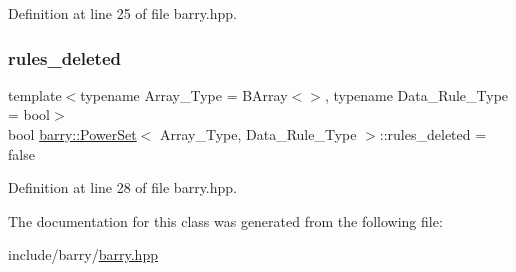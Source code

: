 Definition at line 25 of file barry.\+hpp.

\mbox{\label{classbarry_1_1_power_set_aac868bcdb4a7f6c17d35aa29cf8e5028}} 
\subsubsection{\texorpdfstring{rules\+\_\+deleted}{rules\_deleted}}
{\footnotesize\ttfamily template$<$typename Array\+\_\+\+Type  = B\+Array$<$$>$, typename Data\+\_\+\+Rule\+\_\+\+Type  = bool$>$ \\
bool \hyperlink{classbarry_1_1_power_set}{barry\+::\+Power\+Set}$<$ Array\+\_\+\+Type, Data\+\_\+\+Rule\+\_\+\+Type $>$\+::rules\+\_\+deleted = false}



Definition at line 28 of file barry.\+hpp.



The documentation for this class was generated from the following file\+:\begin{DoxyCompactItemize}
\item 
include/barry/\hyperlink{barry_8hpp}{barry.\+hpp}\end{DoxyCompactItemize}
